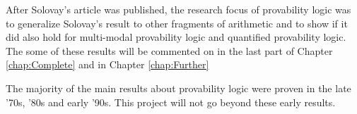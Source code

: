 \documentclass[../main.tex]{subfiles}
\begin{document}
After Solovay's article was published, the research focus of provability logic
was to generalize Solovay's result to other fragments of arithmetic and to
show if 
it did also hold for multi-modal provability logic and quantified provability
logic. The some of these results will be commented on in the last part of
Chapter \ref{chap:Complete} and in Chapter \ref{chap:Further}

The majority of the main results about provability logic were proven in the late
'70s, '80s and early '90s. This project will not go beyond these early results.
\end{document}
